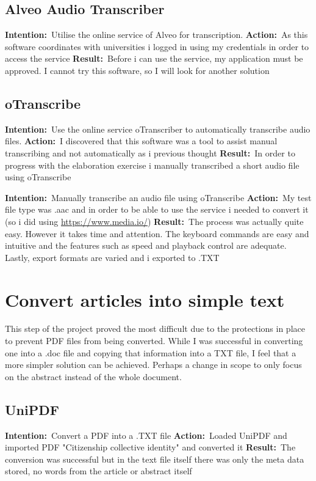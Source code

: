 \documentclass{article}
\newcommand{\intention}[1]{\noindent \textbf{Intention:}{\textnormal\ #1} \newline}
\newcommand{\action}[1]{\textbf{Action:}{\textnormal\ #1} \newline}
\newcommand{\result}[1]{\textbf{Result:}{\textnormal\ #1} \newline}
\begin{document}
\subsection{Alveo Audio Transcriber}

\intention{Utilise the online service of Alveo for transcription.}
\action{As this software coordinates with universities i logged in using my credentials in order to access the service}
\result{Before i can use the service, my application must be approved. I cannot try this software, so I will look for another solution}

\subsection{oTranscribe}

\intention{Use the online service oTranscriber to automatically transcribe audio files.}
\action{I discovered that this software was a tool to assist manual transcribing and not automatically as i previous thought}
\result{In order to progress with the elaboration exercise i manually transcribed a short audio file using oTranscribe}

\intention{Manually transcribe an audio file using oTranscribe}
\action{My test file type was .aac and in order to be able to use the service i needed to convert it (so i did using \url{https://www.media.io/})}
\result{The process was actually quite easy. However it takes time and attention. The keyboard commands are easy and intuitive and the features such as speed and playback control are adequate. Lastly, export formats are varied and i exported to .TXT}



\section{Convert articles into simple text}
This step of the project proved the most difficult due to the protections in place to prevent PDF files from being converted. While I was successful in converting one into a .doc file and copying that information into a TXT file, I feel that a more simpler solution can be achieved. Perhaps a change in scope to only focus on the abstract instead of the whole document.
\subsection{UniPDF}
\intention{Convert a PDF into a .TXT file}
\action{Loaded UniPDF and imported PDF "Citizenship collective identity" and converted it}
\result{The conversion was successful but in the text file itself there was only the meta data stored, no words from the article or abstract itself}
\end{document}
